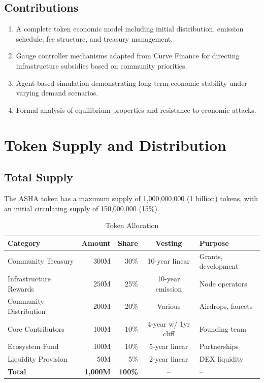 \documentclass[11pt,a4paper]{article}
\newcommand{\asha}{\textsc{ASHA}\xspace}
\begin{document}
\subsection{Contributions}

\begin{enumerate}[label=(\roman*)]
    \item A complete token economic model including initial distribution, emission schedule, fee structure, and treasury management.
    \item Gauge controller mechanisms adapted from Curve Finance for directing infrastructure subsidies based on community priorities.
    \item Agent-based simulation demonstrating long-term economic stability under varying demand scenarios.
    \item Formal analysis of equilibrium properties and resistance to economic attacks.
\end{enumerate}

\section{Token Supply and Distribution}

\subsection{Total Supply}

The \asha token has a maximum supply of 1{,}000{,}000{,}000 (1 billion) tokens, with an initial circulating supply of 150{,}000{,}000 (15\%).

\begin{table}[H]
\centering
\caption{Token Allocation}
\label{tab:allocation}
\begin{tabular}{lrrcl}
\toprule
\textbf{Category} & \textbf{Amount} & \textbf{Share} & \textbf{Vesting} & \textbf{Purpose} \\
\midrule
Community Treasury & 300M & 30\% & 10-year linear & Grants, development \\
Infrastructure Rewards & 250M & 25\% & 10-year emission & Node operators \\
Community Distribution & 200M & 20\% & Various & Airdrops, faucets \\
Core Contributors & 100M & 10\% & 4-year w/ 1yr cliff & Founding team \\
Ecosystem Fund & 100M & 10\% & 5-year linear & Partnerships \\
Liquidity Provision & 50M & 5\% & 2-year linear & DEX liquidity \\
\midrule
\textbf{Total} & \textbf{1{,}000M} & \textbf{100\%} & -- & -- \\
\bottomrule
\end{tabular}
\end{table}
\end{document}
